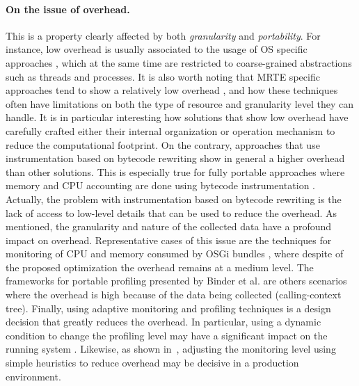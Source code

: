 \paragraph{On the issue of overhead.}
This is a property clearly affected by both \textit{granularity} and \textit{portability}.
For instance, low overhead is usually associated to the usage of OS specific approaches \cite{Banga:1999:RCN:296806.296810, DBLP:conf/pppj/PeternierBBP11, Soltesz:2007:COS:1272998.1273025, Kamp00jails:confining}, which at the same time are restricted to coarse-grained abstractions such as threads and processes.
It is also worth noting that MRTE specific approaches tend to show a relatively low overhead \cite{Price:2003:GCM:829515.830545,dsn/09/geoffray/ijvm, Dmitriev:2004:PJA:974043.974067, citeulike:481405, Attouchi:2014:MMM:2602458.2602467, back_processes_2000, czajkowski_multitasking_2001}, and how these techniques often have limitations on both the type of resource and granularity level they can handle.
It is in particular interesting how solutions that show low overhead have carefully crafted  either their internal organization \cite{back_processes_2000, czajkowski_multitasking_2001} or operation mechanism \cite{Dmitriev:2004:PJA:974043.974067, citeulike:481405} to reduce the computational footprint.
On the contrary, approaches that use instrumentation based on bytecode rewriting show in general a higher overhead than other solutions.
This is especially true for fully portable approaches where memory and CPU accounting are done using bytecode instrumentation \cite{czajkowski_jres:_1998, Hulaas:2004:PTP:1014007.1014024,Hulaas:2008:PTL,binder_portable_2001, Binder200657,Hulaas:2008:PTL}.
Actually, the problem with instrumentation based on bytecode rewriting is the lack of access to low-level details that can be used to reduce the overhead.
As mentioned, the granularity and nature of the collected data have a profound impact on overhead.
Representative cases of this issue are the techniques for monitoring of CPU and memory consumed by OSGi bundles \cite{Maurel:2012:AME:2304736.2304763, Attouchi:2014:MMM:2602458.2602467}, where despite of the proposed optimization the overhead remains at a medium level.
The frameworks for portable profiling presented by Binder et al. \cite{Binder200645, Binder:2009:PPV:1464245.1464249} are others scenarios where the overhead is high because of the data being collected (calling-context tree).
Finally, using adaptive monitoring and profiling techniques is a design decision that greatly reduces the overhead.
In particular, using a dynamic condition to change the profiling level may have a significant impact on the running system \cite{Dmitriev:2004:PJA:974043.974067, citeulike:481405}.
Likewise, as shown in~\cite{Maurel:2012:AME:2304736.2304763}, adjusting the monitoring level using simple heuristics to reduce overhead may be decisive in a production environment.

